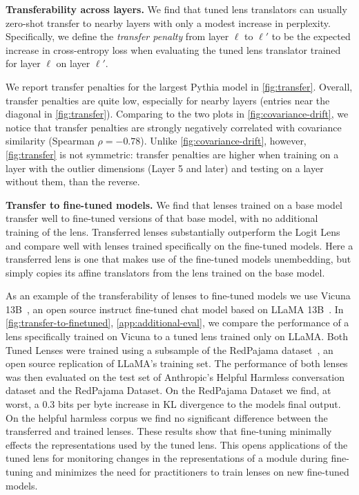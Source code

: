\documentclass{article}
\theoremstyle{plain}
\theoremstyle{definition}
\begin{document}
\textbf{Transferability across layers.} We find that tuned lens translators can usually zero-shot transfer to nearby layers with only a modest increase in perplexity. Specifically, we define the \emph{transfer penalty} from layer $\ell$ to $\ell'$ to be the expected increase in cross-entropy loss when evaluating the tuned lens translator trained for layer $\ell$ on layer $\ell'$.

We report transfer penalties for the largest Pythia model in \cref{fig:transfer}. Overall, transfer penalties are quite low, especially for nearby layers (entries near the diagonal in \cref{fig:transfer}). Comparing to the two plots in \cref{fig:covariance-drift}, we notice that transfer penalties are strongly negatively correlated with covariance similarity (Spearman $\rho = -0.78$). Unlike \cref{fig:covariance-drift}, however, \cref{fig:transfer} is not symmetric: transfer penalties are higher when training on a layer with the outlier dimensions (Layer 5 and later) and testing on a layer without them, than the reverse.

\textbf{Transfer to fine-tuned models.} We find that lenses trained on a base model transfer well to fine-tuned versions of that base model, with no additional training of the lens. Transferred lenses substantially outperform the Logit Lens and compare well with lenses trained specifically on the fine-tuned models. Here a transferred lens is one that makes use of the fine-tuned models unembedding, but simply copies its affine translators from the lens trained on the base model.

As an example of the transferability of lenses to fine-tuned models we use Vicuna 13B~\citep{vicuna2023}, an open source instruct fine-tuned chat model based on LLaMA 13B~\citep{touvron2023llama}. In \cref{fig:transfer-to-finetuned}, \cref{app:additional-eval}, we compare the performance of a lens specifically trained on Vicuna to a tuned lens trained only on LLaMA. Both Tuned Lenses were trained using a subsample of the RedPajama dataset~\citep{redpj2023}, an open source replication of  LLaMA's training set. The performance of both lenses was then evaluated on the test set of Anthropic's Helpful Harmless \citep{bai2022training} conversation dataset and the RedPajama Dataset. On the RedPajama Dataset we find, at worst, a 0.3 bits per byte increase in KL divergence to the models final output. On the helpful harmless corpus we find no significant difference between the transferred and trained lenses. These results show that fine-tuning minimally effects the representations used by the tuned lens. This opens applications of the tuned lens for monitoring changes in the representations of a module during fine-tuning and minimizes the need for practitioners to train lenses on new fine-tuned models.
\end{document}
